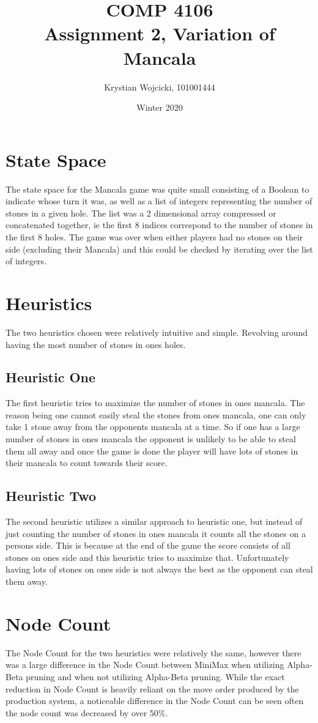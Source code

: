 \documentclass{article}
\title{COMP 4106\\
	\large{Assignment 2, Variation of Mancala}}
\author{Krystian Wojcicki, 101001444}
\date{Winter 2020}
\begin{document}
\maketitle

\section{State Space}
The state space for the Mancala game was quite small consisting of a Boolean to indicate whose turn it was, as well as a list of integers representing the number of stones in a given hole. The list was a 2 dimensional array compressed or concatenated together, ie the first 8 indices correspond to the number of stones in the first 8 holes.  The game was over when either players had no stones on their side (excluding their Mancala) and this could be checked by iterating over the list of integers.

\section{Heuristics}

The two heuristics chosen were relatively intuitive and simple. Revolving around having the most number of stones in ones holes.

\subsection{Heuristic One}

The first heuristic tries to maximize the number of stones in ones mancala. The reason being one cannot easily steal the stones from ones mancala, one can only take 1 stone away from the opponents mancala at a time. So if one has a large number of stones in ones mancala the opponent is unlikely to be able to steal them all away and once the game is done the player will have lots of stones in their mancala to count towards their score.

\subsection{Heuristic Two}

The second heuristic utilizes a similar approach to heuristic one, but instead of just counting the number of stones in ones mancala it counts all the stones on a persons side. This is because at the end of the game the score consists of all stones on ones side and this heuristic tries to maximize that. Unfortunately having lots of stones on ones side is not always the best as the opponent can steal them away.

\section{Node Count}
The Node Count for the two heuristics were relatively the same, however there was a large difference in the Node Count between MiniMax when utilizing Alpha-Beta pruning and when not utilizing Alpha-Beta pruning. While the exact reduction in Node Count is heavily reliant on the move order produced by the production system, a noticeable difference in the Node Count can be seen often the node count was decreased by over 50\%.
\end{document}
